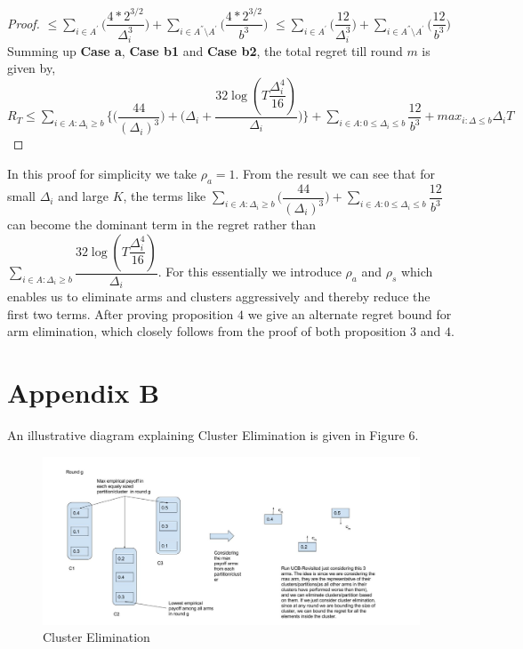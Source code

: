 \begin{proof}
\newline
\hspace*{0em}$\leq\sum_{i\in A^{'}}\bigg(\dfrac{4*2^{3/2}}{\Delta_{i}^{3}} \bigg)+\sum_{i\in A^{''}\setminus A^{'}}\bigg(\dfrac{4*2^{3/2}}{b^{3}} \bigg)$
\newline
\hspace*{0em}$\leq\sum_{i\in A^{'}}\bigg(\dfrac{12}{\Delta_{i}^{3}} \bigg)+\sum_{i\in A^{''}\setminus A^{'}}\bigg(\dfrac{12}{b^{3}} \bigg)$
\newline
Summing up \textbf{Case a}, \textbf{Case b1} and \textbf{Case b2}, the total regret till round $m$ is given by,
\newline $R_{T}\leq \sum_{i\in A:\Delta_{i}\geq b}\bigg \lbrace \bigg(\dfrac{44}{(\Delta_{i})^{3}}\bigg) + \bigg(\Delta_{i}+\dfrac{32\log{(T\dfrac{\Delta_{i}^{4}}{16})}}{\Delta_{i}}\bigg)\bigg\rbrace + \sum_{i\in A:0\leq\Delta_{i}\leq b}\dfrac{12}{b^{3}} + max_{i:\Delta\leq b}\Delta_{i}T$
\end{proof}

\begin{remark}
In this proof for simplicity we take $\rho_{a}=1$. From the result we can see that for small $\Delta_{i}$ and large $K$, the terms like $ \sum_{i\in A:\Delta_{i}\geq b}\bigg(\dfrac{44}{(\Delta_{i})^{3}}\bigg) + \sum_{i\in A:0\leq\Delta_{i}\leq b}\dfrac{12}{b^{3}}$ can become the dominant term in the regret rather than $\sum_{i\in A:\Delta_{i}\geq b}\dfrac{32\log{(T\dfrac{\Delta_{i}^{4}}{16})}}{\Delta_{i}}$. For this essentially we introduce $\rho_{a}$ and $\rho_{s}$ which enables us to eliminate arms and clusters aggressively and thereby reduce the first two terms. After proving proposition $4$ we give an alternate regret bound for arm elimination, which closely follows from the proof of both proposition $3$ and $4$.  
\end{remark}


\section{Appendix B}

An illustrative diagram explaining Cluster Elimination is given in Figure 6.

\begin{figure}
\includegraphics[scale=0.3]{img/diagCluster.jpg}
\caption{Cluster Elimination}
\end{figure}

